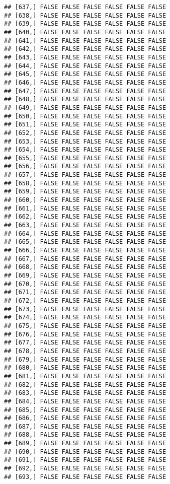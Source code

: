 \documentclass[
]{article}
\begin{document}
\begin{verbatim}
## [637,] FALSE FALSE FALSE FALSE FALSE FALSE
## [638,] FALSE FALSE FALSE FALSE FALSE FALSE
## [639,] FALSE FALSE FALSE FALSE FALSE FALSE
## [640,] FALSE FALSE FALSE FALSE FALSE FALSE
## [641,] FALSE FALSE FALSE FALSE FALSE FALSE
## [642,] FALSE FALSE FALSE FALSE FALSE FALSE
## [643,] FALSE FALSE FALSE FALSE FALSE FALSE
## [644,] FALSE FALSE FALSE FALSE FALSE FALSE
## [645,] FALSE FALSE FALSE FALSE FALSE FALSE
## [646,] FALSE FALSE FALSE FALSE FALSE FALSE
## [647,] FALSE FALSE FALSE FALSE FALSE FALSE
## [648,] FALSE FALSE FALSE FALSE FALSE FALSE
## [649,] FALSE FALSE FALSE FALSE FALSE FALSE
## [650,] FALSE FALSE FALSE FALSE FALSE FALSE
## [651,] FALSE FALSE FALSE FALSE FALSE FALSE
## [652,] FALSE FALSE FALSE FALSE FALSE FALSE
## [653,] FALSE FALSE FALSE FALSE FALSE FALSE
## [654,] FALSE FALSE FALSE FALSE FALSE FALSE
## [655,] FALSE FALSE FALSE FALSE FALSE FALSE
## [656,] FALSE FALSE FALSE FALSE FALSE FALSE
## [657,] FALSE FALSE FALSE FALSE FALSE FALSE
## [658,] FALSE FALSE FALSE FALSE FALSE FALSE
## [659,] FALSE FALSE FALSE FALSE FALSE FALSE
## [660,] FALSE FALSE FALSE FALSE FALSE FALSE
## [661,] FALSE FALSE FALSE FALSE FALSE FALSE
## [662,] FALSE FALSE FALSE FALSE FALSE FALSE
## [663,] FALSE FALSE FALSE FALSE FALSE FALSE
## [664,] FALSE FALSE FALSE FALSE FALSE FALSE
## [665,] FALSE FALSE FALSE FALSE FALSE FALSE
## [666,] FALSE FALSE FALSE FALSE FALSE FALSE
## [667,] FALSE FALSE FALSE FALSE FALSE FALSE
## [668,] FALSE FALSE FALSE FALSE FALSE FALSE
## [669,] FALSE FALSE FALSE FALSE FALSE FALSE
## [670,] FALSE FALSE FALSE FALSE FALSE FALSE
## [671,] FALSE FALSE FALSE FALSE FALSE FALSE
## [672,] FALSE FALSE FALSE FALSE FALSE FALSE
## [673,] FALSE FALSE FALSE FALSE FALSE FALSE
## [674,] FALSE FALSE FALSE FALSE FALSE FALSE
## [675,] FALSE FALSE FALSE FALSE FALSE FALSE
## [676,] FALSE FALSE FALSE FALSE FALSE FALSE
## [677,] FALSE FALSE FALSE FALSE FALSE FALSE
## [678,] FALSE FALSE FALSE FALSE FALSE FALSE
## [679,] FALSE FALSE FALSE FALSE FALSE FALSE
## [680,] FALSE FALSE FALSE FALSE FALSE FALSE
## [681,] FALSE FALSE FALSE FALSE FALSE FALSE
## [682,] FALSE FALSE FALSE FALSE FALSE FALSE
## [683,] FALSE FALSE FALSE FALSE FALSE FALSE
## [684,] FALSE FALSE FALSE FALSE FALSE FALSE
## [685,] FALSE FALSE FALSE FALSE FALSE FALSE
## [686,] FALSE FALSE FALSE FALSE FALSE FALSE
## [687,] FALSE FALSE FALSE FALSE FALSE FALSE
## [688,] FALSE FALSE FALSE FALSE FALSE FALSE
## [689,] FALSE FALSE FALSE FALSE FALSE FALSE
## [690,] FALSE FALSE FALSE FALSE FALSE FALSE
## [691,] FALSE FALSE FALSE FALSE FALSE FALSE
## [692,] FALSE FALSE FALSE FALSE FALSE FALSE
## [693,] FALSE FALSE FALSE FALSE FALSE FALSE

\end{verbatim}
\end{document}
